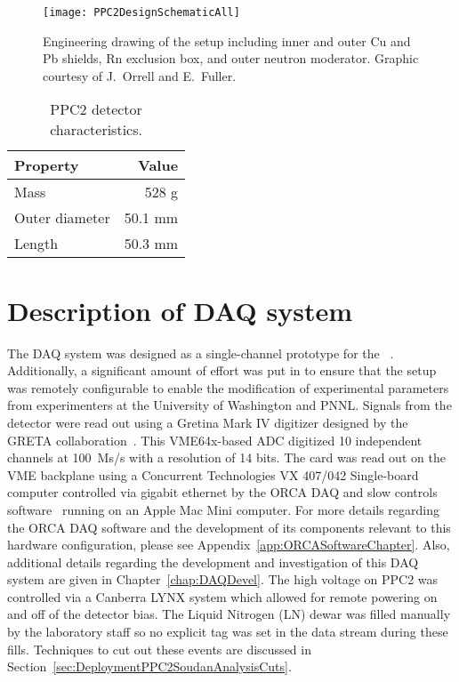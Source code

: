 			\begin{figure}
				\centering
				\texttt{[image: PPC2DesignSchematicAll]}
				\caption[Engineering drawing of PPC2 deployment, detailing outer components]
				{Engineering drawing of the setup including inner and outer Cu and Pb shields, Rn exclusion box, 
				and outer neutron moderator.  Graphic courtesy of J.~Orrell and E.~Fuller.}
				\label{fig:PPC2Shield}
			\end{figure}
	
			\begin{table}
				\centering
				\begin{tabular}{l r}
					\toprule
					Property & Value \\
					\midrule
					Mass & 528 g \\
					Outer diameter & 50.1 mm \\
					Length & 50.3 mm \\
					\bottomrule
				\end{tabular}
				\caption[PPC2 detector characteristics]
				{PPC2 detector characteristics.  }
				\label{tab:PPC2Characteristics}
			\end{table}
	
	\section{Description of DAQ system}
	\label{sec:DeploymentPPC2SoudanDAQSystem}
	
	The DAQ system was designed as a single-channel prototype for the \MJ~\minmod.  Additionally, a significant amount of effort was put in to ensure that the setup was remotely configurable to enable the modification of experimental parameters from experimenters at the University of Washington and PNNL.  Signals from the detector were read out using a Gretina Mark IV digitizer designed by the GRETA collaboration~\cite{Anderson:2009p1293}.  This VME64x-based ADC digitized 10 independent channels at 100~Ms/s with a resolution of 14 bits.  The card was read out on the VME backplane using a Concurrent Technologies VX 407/042 Single-board computer controlled via gigabit ethernet by the ORCA DAQ and slow controls software~\cite{ORCA} running on an Apple Mac Mini computer.  For more details regarding the ORCA DAQ software and the development of its components relevant to this hardware configuration, please see Appendix~\ref{app:ORCASoftwareChapter}.  Also, additional details regarding the development and investigation of this DAQ system are given in Chapter~\ref{chap:DAQDevel}. The high voltage on PPC2 was controlled via a Canberra LYNX system which allowed for remote powering on and off of the detector bias.  The Liquid Nitrogen (LN) dewar was filled manually by the laboratory staff so no explicit tag was set in the data stream during these fills.  Techniques to cut out these events are discussed in Section~\ref{sec:DeploymentPPC2SoudanAnalysisCuts}.
	    
